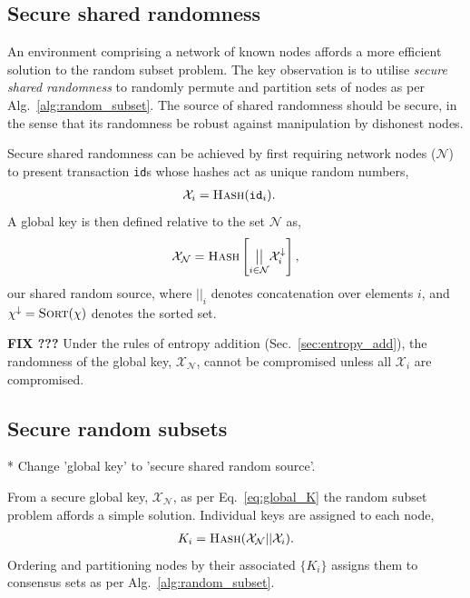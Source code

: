 \subsection{Secure shared randomness} \label{sec:secure_shared_randomness}

An environment comprising a network of known nodes affords a more efficient solution to the random subset problem. The key observation is to utilise  \emph{secure shared randomness} to randomly permute and partition sets of nodes as per Alg.~\ref{alg:random_subset}. The source of shared randomness should be secure, in the sense that its randomness be robust against manipulation by dishonest nodes.

Secure shared randomness can be achieved by first requiring network nodes ($\mathcal{N}$) to present transaction \texttt{id}s whose hashes act as unique random numbers,
\begin{align}
	\mathcal{X}_i &= \textsc{Hash}(\mathtt{id}_i).\end{align}
A global key is then defined relative to the set $\mathcal{N}$ as,
\begin{align} \label{eq:global_K}
	\mathcal{X}_\mathcal{N} = \textsc{Hash}\left[\underset{i\in\mathcal{N}}{\big{|}\big{|}} \mathcal{X}^{\downarrow}_i\right],
\end{align}
our shared random source, where ${||}_i$ denotes concatenation over elements $i$, and \mbox{$\chi^{\downarrow}=\textsc{Sort}(\chi)$} denotes the sorted set.

\textbf{FIX ???}
Under the rules of entropy addition (Sec.~\ref{sec:entropy_add}), the randomness of the global key, $\mathcal{X}_\mathcal{N}$, cannot be compromised unless all $\mathcal{X}_i$ are compromised.

\subsection{Secure random subsets} \label{sec:hash_based_random_subsets}

* Change 'global key' to 'secure shared random source'.

From a secure global key, $\mathcal{X}_\mathcal{N}$, as per Eq.~\eqref{eq:global_K} the random subset problem affords a simple solution. Individual keys are assigned to each node,
\begin{align}
	K_i = \textsc{Hash}(\mathcal{X}_\mathcal{N} || \mathcal{X}_i).
\end{align}
Ordering and partitioning nodes by their associated $\{K_i\}$ assigns them to consensus sets as per Alg.~\ref{alg:random_subset}.


